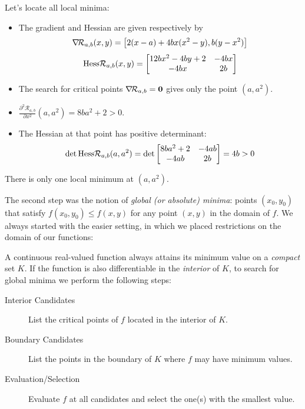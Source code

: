 \begin{example}
Let's locate all local minima:
\begin{itemize}
	\item The gradient and Hessian are given respectively by
	\begin{equation*}
	\mathop{\nabla\! {\mathcal{R}_{a,b}}}(x,y) = \big[ 2(x-a) +4bx(x^2-y) , b(y-x^2) \big] \\
	\end{equation*}
	\begin{equation*}
	\mathop{\mathrm{Hess}{\mathcal{R}_{a,b}}}(x,y) = \begin{bmatrix}
	12bx^2-4by+2 & -4bx \\
	-4bx & 2b
	\end{bmatrix}
	\end{equation*}
	\item The search for critical points $\mathop{\nabla\! {\mathcal{R}_{a,b}}} = \boldsymbol{0}$ gives only the point $(a,a^2)$.
	\item $\frac{\partial^2 \mathcal{R}_{a,b}}{\partial x^2}(a,a^2) = 8ba^2+2 > 0$.
	\item The Hessian at that point has positive determinant:
	\begin{equation*}
	\det \mathop{\mathrm{Hess}{\mathcal{R}_{a,b}}}(a,a^2) = \det \begin{bmatrix}
	8ba^2+2 & -4ab \\
	-4ab & 2b
	\end{bmatrix} = 4b > 0
	\end{equation*}
\end{itemize}
There is only one local minimum at $(a,a^2)$.
\end{example}

\separator

The second step was the notion of \emph{global (or absolute) minima}: points $(x_0,y_0)$ that satisfy $f(x_0,y_0) \leq f(x,y)$ for any point $(x,y)$ in the domain of $f$.  We always started with the easier setting, in which we placed restrictions on the domain of our functions:

\begin{theorem}\label{theorem:MaxMinCompact}
A continuous real-valued function always attains its minimum value on a \emph{compact} set $K$. If the function is also differentiable in the \emph{interior} of $K$, to search for global minima we perform the following steps:
\begin{description}
	\item[Interior Candidates] List the critical points of $f$ located in the interior of $K$.
	\item[Boundary Candidates] List the points in the boundary of $K$ where $f$ may have minimum values.
	\item [Evaluation/Selection] Evaluate $f$ at all candidates and select the one(s) with the smallest value.
\end{description}
\end{theorem}

